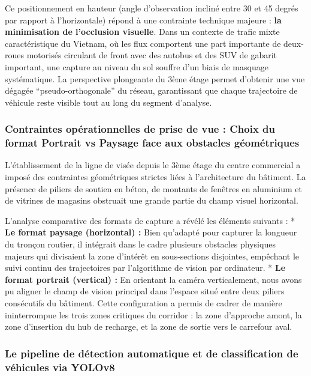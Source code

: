 \documentclass[10pt, a4paper]{article}
\begin{document}
Ce positionnement en hauteur (angle d'observation incliné entre 30 et 45
degrés par rapport à l'horizontale) répond à une contrainte technique
majeure : \textbf{la minimisation de l'occlusion visuelle}. Dans un
contexte de trafic mixte caractéristique du Vietnam, où les flux
comportent une part importante de deux-roues motorisés circulant de
front avec des autobus et des SUV de gabarit important, une capture au
niveau du sol souffre d'un biais de masquage systématique. La
perspective plongeante du 3ème étage permet d'obtenir une vue dégagée
``pseudo-orthogonale'' du réseau, garantissant que chaque trajectoire de
véhicule reste visible tout au long du segment d'analyse.

\subsubsection{Contraintes opérationnelles de prise de vue : Choix du
format Portrait vs Paysage face aux obstacles
géométriques}\label{contraintes-opuxe9rationnelles-de-prise-de-vue-choix-du-format-portrait-vs-paysage-face-aux-obstacles-guxe9omuxe9triques}

L'établissement de la ligne de visée depuis le 3ème étage du centre
commercial a imposé des contraintes géométriques strictes liées à
l'architecture du bâtiment. La présence de piliers de soutien en béton,
de montants de fenêtres en aluminium et de vitrines de magasins
obstruait une grande partie du champ visuel horizontal.

L'analyse comparative des formats de capture a révélé les éléments
suivants : * \textbf{Le format paysage (horizontal) :} Bien qu'adapté
pour capturer la longueur du tronçon routier, il intégrait dans le cadre
plusieurs obstacles physiques majeurs qui divisaient la zone d'intérêt
en sous-sections disjointes, empêchant le suivi continu des trajectoires
par l'algorithme de vision par ordinateur. * \textbf{Le format portrait
(vertical) :} En orientant la caméra verticalement, nous avons pu
aligner le champ de vision principal dans l'espace situé entre deux
piliers consécutifs du bâtiment. Cette configuration a permis de cadrer
de manière ininterrompue les trois zones critiques du corridor : la zone
d'approche amont, la zone d'insertion du hub de recharge, et la zone de
sortie vers le carrefour aval.

\subsubsection{Le pipeline de détection automatique et de classification
de véhicules via
YOLOv8}\label{le-pipeline-de-duxe9tection-automatique-et-de-classification-de-vuxe9hicules-via-yolov8}
\end{document}

